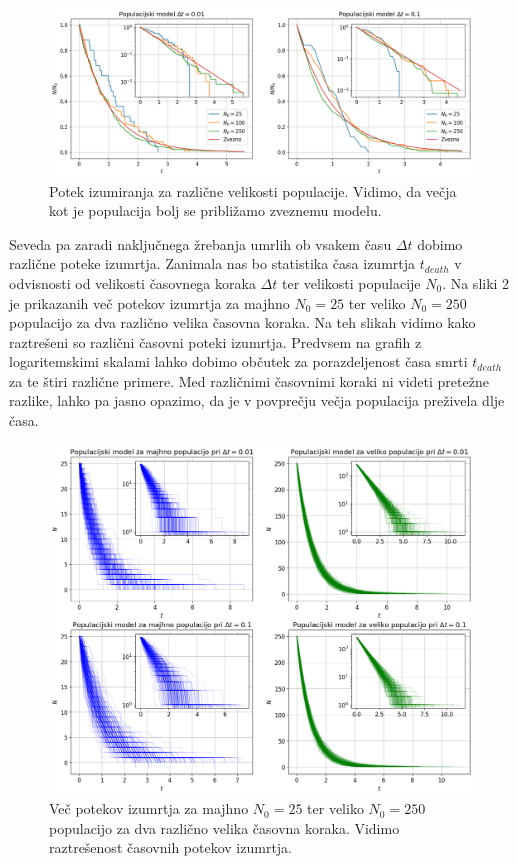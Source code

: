 \documentclass[slovene,11pt,a4paper]{article}
\begin{document}
\begin{figure}[h!]
\centering
\includegraphics[width=\linewidth]{slika1.png}
\caption{Potek izumiranja za različne velikosti populacije. Vidimo, da večja kot je populacija bolj se približamo zveznemu modelu.}
\end{figure}

Seveda pa zaradi naključnega žrebanja umrlih ob vsakem času $\Delta t$ dobimo različne poteke izumrtja. Zanimala nas bo statistika časa izumrtja $t_{death}$ v odvisnosti od velikosti časovnega koraka $\Delta t$ ter velikosti populacije $N_0$. Na sliki 2 je prikazanih več potekov izumrtja za majhno $N_0=25$ ter veliko $N_0=250$ populacijo za dva različno velika časovna koraka. Na teh slikah vidimo kako raztrešeni so različni časovni poteki izumrtja. Predvsem na grafih z logaritemskimi skalami lahko dobimo občutek za porazdeljenost časa smrti $t_{death}$ za te štiri različne primere. Med različnimi časovnimi koraki ni videti pretežne razlike, lahko pa jasno opazimo, da je v povprečju večja populacija preživela dlje časa.

\newpage

\begin{figure}[h!]
\centering
\includegraphics[width=15cm]{slika2.png}
\caption{Več potekov izumrtja za majhno $N_0=25$ ter veliko $N_0=250$ populacijo za dva različno velika časovna koraka. Vidimo raztrešenost časovnih potekov izumrtja.}
\end{figure}
\end{document}
